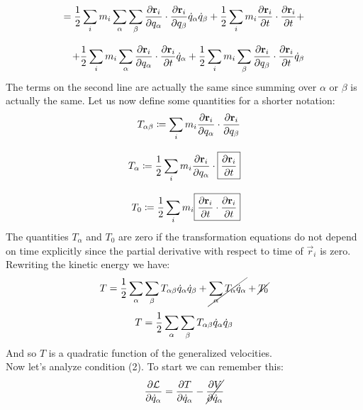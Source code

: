 \begin{equation}
    \begin{split}
        = \dfrac{1}{2}\bigsum_i m_i \bigsum_{\alpha}\bigsum_{\beta}\pdv{ \vec{r}_i}{ q_{\alpha}}\cdot\pdv{ \vec{r}_i}{ q_{\beta}}\dot{q}_{\alpha}\dot{q}_{\beta} + \dfrac{1}{2}\bigsum_i m_i \pdv{ \vec{r}_i}{ t} \cdot \pdv{ \vec{r}_i}{ t} +\\[8pt]
        + \dfrac{1}{2}\bigsum_i m_i \bigsum_{\alpha}\pdv{ \vec{r}_i}{ q_{\alpha}} \cdot \pdv{ \vec{r}_i}{ t} \dot{q}_{\alpha} + \dfrac{1}{2}\bigsum_i m_i \bigsum_{\beta}\pdv{ \vec{r}_i}{ q_{\beta}} \cdot \pdv{ \vec{r}_i}{ t}\dot{q}_{\beta}
    \end{split}
\end{equation}
The terms on the second line are actually the same since summing over $\alpha$ or $\beta$ is actually the same. Let us now define some quantities for a shorter notation:
\begin{equation}
    \begin{split}
        T_{\alpha \beta} \defineeq \bigsum_i m_i \pdv{ \vec{r}_i}{ q_{\alpha}}\cdot\pdv{ \vec{r}_i}{ q_{\beta}}\\[8pt]
        T_{\alpha} \defineeq \dfrac{1}{2} \bigsum_i m_i \pdv{ \vec{r}_i}{ q_{\alpha}} \cdot \boxed{\pdv{ \vec{r}_i}{ t}}\\[8pt]
        T_0 \defineeq \dfrac{1}{2}\bigsum_i m_i \boxed{\pdv{ \vec{r}_i}{ t} \cdot \pdv{ \vec{r}_i}{ t}}
    \end{split}
\end{equation}
The quantities $T_{\alpha}$ and $T_0$ are zero if the transformation equations do not depend on time explicitly since the partial derivative with respect to time of $\vec{r}_i$ is zero. Rewriting the kinetic energy we have:
\begin{equation}
    T = \dfrac{1}{2}\displaystyle\sum_{\alpha}\displaystyle\sum_{\beta}T_{\alpha \beta}\dot{q}_{\alpha}\dot{q}_{\beta} + \cancel{\displaystyle\sum_{\alpha}T_{\alpha}\dot{q}_{\alpha}} + \cancel{T_0}
\end{equation}
\begin{equation} \label{e:kinetic_energy}
    T = \dfrac{1}{2}\displaystyle\sum_{\alpha}\displaystyle\sum_{\beta}T_{\alpha \beta}\dot{q}_{\alpha}\dot{q}_{\beta}
\end{equation}
And so $T$ is a quadratic function of the generalized velocities.\\
Now let's analyze condition (2). To start we can remember this:
\begin{equation}
    \pdv{\lagr}{\dot{q}_{\alpha}} = \pdv{ T}{ \dot{q}_{\alpha}} - \cancel{\pdv{V}{\dot{q}_{\alpha}}}
\end{equation}
